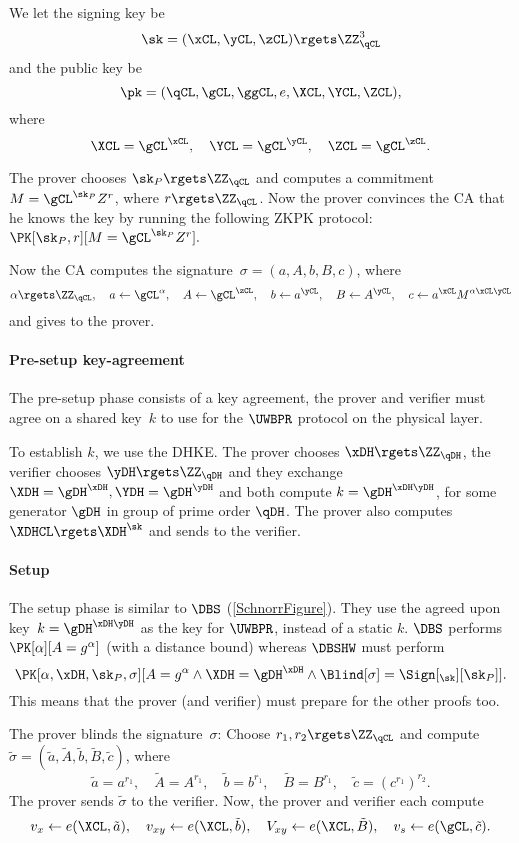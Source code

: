 We let the  signing key be \[
  \sk = (\xCL, \yCL, \zCL)\rgets \ZZ_{\qCL}^3
\] and the public key be \[
  \pk = (\qCL, \gCL, \ggCL, e, \XCL, \YCL, \ZCL),
\] where \[
  \XCL = \gCL^{\xCL}, \quad
  \YCL = \gCL^{\yCL}, \quad
  \ZCL = \gCL^{\zCL}.
\]

The prover chooses \(\sk_P\rgets \ZZ_{\qCL}\) and computes a commitment \(M = 
\gCL^{\sk_P} Z^r\), where \(r\rgets \ZZ_{\qCL}\).
Now the prover convinces the \ac{CA} that he knows the key by running the 
following \ac{ZKPK} protocol: \(
  \PK[\sk_P, r][M = \gCL^{\sk_P} Z^r].
\)

Now the \ac{CA} computes the signature~\(\sigma = (a, A, b, B, c)\), where \[
  \alpha\rgets \ZZ_{\qCL}, \quad a\gets \gCL^\alpha, \quad
  A\gets \gCL^{\zCL}, \quad
  b\gets a^{\yCL}, \quad
  B\gets A^{\yCL}, \quad
  c\gets a^{\xCL} M^{\alpha \xCL \yCL}
\] and gives to the prover.

\paragraph*{Pre-setup key-agreement}

The pre-setup phase consists of a key agreement, the prover and verifier must 
agree on a shared key~\(k\) to use for the \(\UWBPR\) protocol on the physical 
layer.

To establish \(k\), we use the \ac{DHKE}.
The prover chooses \(\xDH \rgets \ZZ_{\qDH}\), the verifier chooses 
\(\yDH\rgets \ZZ_{\qDH}\) and they exchange \(\XDH = \gDH^{\xDH}, \YDH = 
\gDH^{\yDH}\) and both compute
\(k = \gDH^{\xDH \yDH}\), for some generator \(\gDH\) in  group of 
prime order \(\qDH\).
The prover also computes \(\XDHCL\rgets \XDH^{\sk}\) and sends to the verifier.

\paragraph*{Setup}

The setup phase is similar to \(\DBS\) (\cref{SchnorrFigure}).
They use the agreed upon key~\(k = \gDH^{\xDH \yDH}\) as the key for 
\(\UWBPR\), instead of a static \(k\).
\(\DBS\) performs \(
  \PK[\alpha][A = g^\alpha]
\) (with a distance bound) whereas \(\DBSHW\) must perform \[
  \PK[\alpha, \xDH, \sk_P, \sigma][
    A = g^\alpha \land
    \XDH = \gDH^{\xDH} \land
    \Blind[\sigma] = \Sign[_{\sk}][\sk_P]
  ].
\] This means that the prover (and verifier) must prepare for the other proofs 
too.

The prover blinds the signature~\(\sigma\):
Choose \(r_1, r_2\rgets \ZZ_{\qCL}\) and compute \(\tilde \sigma = (\tilde a, 
\tilde A, \tilde b, \tilde B, \tilde c)\), where \[
  \tilde a = a^{r_1}, \quad
  \tilde A = A^{r_1}, \quad
  \tilde b = b^{r_1}, \quad
  \tilde B = B^{r_1}, \quad
  \tilde c = (c^{r_1})^{r_2}.
\]
The prover sends \(\tilde \sigma\) to the verifier.
Now, the prover and verifier each compute \[
  v_x\gets e(\XCL, \tilde a), \quad
  v_{xy}\gets e(\XCL, \tilde b), \quad
  V_{xy}\gets e(\XCL, \tilde B), \quad
  v_s\gets e(\gCL, \tilde c).
\]

